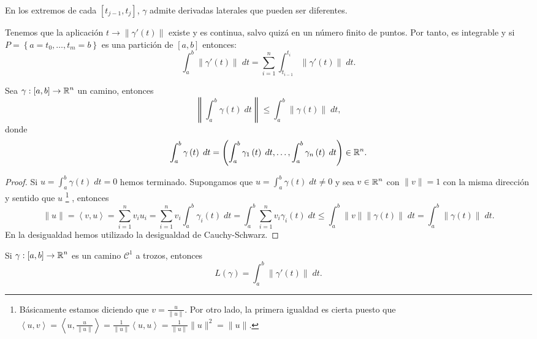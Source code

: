 \begin{observation}
	En los extremos de cada $\displaystyle \left[t_{j-1}, t_{j}\right]  $, $\displaystyle \gamma  $ admite derivadas laterales que pueden ser diferentes. 
\end{observation}
\begin{observation}
	Tenemos que la aplicación $\displaystyle t \to \|\gamma'\left(t\right)\| $ existe y es continua, salvo quizá en un número finito de puntos. Por tanto, es integrable y si $\displaystyle P = \left\{ a = t_{0}, \ldots, t_{m} = b\right\}  $ es una partición de $\displaystyle \left[a,b\right]  $ entonces:
	\[\int^{b}_{a} \|\gamma'\left(t\right)\| \; dt = \sum^{n}_{i = 1}\int^{t_{i}}_{t_{i-1}} \|\gamma'\left(t\right)\| \; dt .\]
\end{observation}
\begin{lema}
	Sea $\displaystyle \gamma : \left[a,b\right] \to \mathbb{R}^{n} $ un camino, entonces
	\[\left\|\int^{b}_{a} \gamma\left(t\right) \; dt\right\| \leq \int^{b}_{a} \|\gamma\left(t\right)\| \; dt ,\]
donde
\[\int^{b}_{a} \gamma\left(t\right) \; dt = \left(\int^{b}_{a} \gamma_{1}\left(t\right) \; dt, \ldots, \int^{b}_{a} \gamma_{n}\left(t\right) \; dt\right)\in \mathbb{R}^{n} .\]
\end{lema}
\begin{proof}
Si $\displaystyle u = \int^{b}_{a} \gamma\left(t\right) \; dt=0 $ hemos terminado. Supongamos que $\displaystyle u = \int^{b}_{a} \gamma\left(t\right) \; dt \neq 0 $ y sea $\displaystyle v \in \mathbb{R}^{n} $ con $\displaystyle \|v\| = 1 $ con la misma dirección y sentido que $\displaystyle u $ 
\footnote{Básicamente estamos diciendo que $\displaystyle v = \frac{u}{\|u\|} $. Por otro lado, la primera igualdad es cierta puesto que $\displaystyle \left\langle u, v \right\rangle = \left\langle u, \frac{u}{\|u\|} \right\rangle =\frac{1}{\|u\|}\left\langle u, u \right\rangle =\frac{1}{\|u\|}\|u\|^{2}=\|u\| $.} , entonces
\[\|u\| = \left\langle v, u \right\rangle = \sum^{n}_{i = 1}v_{i}u_{i}= \sum^{n}_{i = 1}v_{i}\int^{b}_{a} \gamma_{i}\left(t\right) \; dt = \int^{b}_{a} \sum^{n}_{i = 1}v_{i}\gamma_{i}\left(t\right) \; dt\leq \int^{b}_{a} \|v\|\|\gamma\left(t\right)\| \; dt = \int^{b}_{a} \|\gamma\left(t\right)\| \; dt.\]
En la desigualdad hemos utilizado la desigualdad de Cauchy-Schwarz.
\end{proof}
\begin{theorem}
	Si $\displaystyle \gamma:\left[a,b\right] \to \mathbb{R}^{n} $ es un camino $\displaystyle \mathcal{C}^{1} $ a trozos, entonces 
	\[L\left(\gamma \right)=\int^{b}_{a} \|\gamma'\left(t\right)\| \; dt .\]
\end{theorem}
